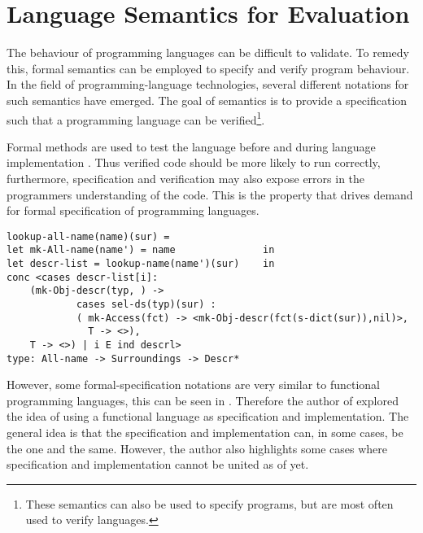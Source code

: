 \section{Language Semantics for Evaluation} \label{sec:language-semenatics}
The behaviour of programming languages can be difficult to validate. To remedy this, formal semantics can be employed to specify and verify program behaviour. In the field of programming-language technologies, several different notations for such semantics have emerged. The goal of semantics is to provide a specification such that a programming language can be verified\footnote{These semantics can also be used to specify programs, but are most often used to verify languages.}. 


Formal methods are used to test the language before and during language implementation \cite{hierons2009using}. Thus verified code should be more likely to run correctly, furthermore, specification and verification may also expose errors in the programmers understanding of the code. This is the property that drives demand for formal specification of programming languages. 

\begin{lstlisting}[caption={Ada Static Semantics Fragment \cite{sestoft:isola}}, label={lst:ada-semantic}]
lookup-all-name(name)(sur) =
let mk-All-name(name') = name               in
let descr-list = lookup-name(name')(sur)    in
conc <cases descr-list[i]:
    (mk-Obj-descr(typ, ) ->
            cases sel-ds(typ)(sur) :
            ( mk-Access(fct) -> <mk-Obj-descr(fct(s-dict(sur)),nil)>,
              T -> <>),
    T -> <>) | i E ind descrl>
type: All-name -> Surroundings -> Descr*

\end{lstlisting}


However, some formal-specification notations are very similar to functional programming languages, this can be seen in . Therefore the author of \cite{sestoft:isola} explored the idea of using a functional language as specification and implementation. The general idea is that the specification and implementation can, in some cases, be the one and the same. However, the author also highlights some cases where specification and implementation cannot be united as of yet.

